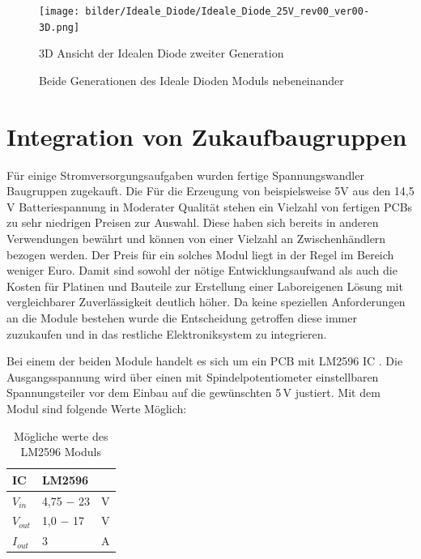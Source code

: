 \begin{figure}[H]
\centering
\texttt{[image: bilder/Ideale\_Diode/Ideale\_Diode\_25V\_rev00\_ver00-3D.png]} 
\caption{3D Ansicht der Idealen Diode zweiter Generation} 
\label{fig:3D Ansicht der Idealen Diode zweiter Generation}
\end{figure}


\begin{figure}[H]
\centering
{}
\caption{Beide Generationen des Ideale Dioden Moduls nebeneinander} 
\label{fig:Beide Generationen des Ideale Dioden Moduls nebeneinander}
\end{figure}

\section{Integration von Zukaufbaugruppen}

Für einige Stromversorgungsaufgaben wurden fertige Spannungswandler Baugruppen zugekauft. Die Für die Erzeugung von beispielsweise 5V aus den 14,5 V Batteriespannung in Moderater Qualität stehen ein Vielzahl von fertigen PCBs zu sehr niedrigen Preisen zur Auswahl. 
Diese haben sich bereits in anderen Verwendungen bewährt und können von einer Vielzahl an Zwischenhändlern bezogen werden. Der Preis für ein solches Modul liegt in der Regel im Bereich weniger Euro. Damit sind sowohl der nötige Entwicklungsaufwand als auch die Kosten für Platinen und Bauteile zur Erstellung einer Laboreigenen Lösung mit vergleichbarer Zuverlässigkeit deutlich höher. Da keine speziellen Anforderungen an die Module bestehen wurde die Entscheidung getroffen diese immer zuzukaufen und in das restliche Elektroniksystem zu integrieren.

Bei einem der beiden Module handelt es sich um ein PCB mit LM2596 IC . 
Die Ausgangsspannung wird über einen mit Spindelpotentiometer einstellbaren Spannungsteiler vor dem Einbau auf die gewünschten 5\,V justiert.
Mit dem Modul sind folgende Werte Möglich:

\begin{table}[h]
\centering
\begin{tabular}{|l|l|l|}
\hline
IC    & LM2596    &   \\ \hline
$V_{in}$  & 4,75 $-$ 23 & V \\ \hline
$V_{out}$ & 1,0 $-$ 17  & V \\ \hline
$I_{out}$ & 3         & A \\ \hline
\end{tabular}
\caption{Mögliche werte des LM2596 Moduls}
\label{Mögliche werte des LM2596 Moduls}
\end{table}

